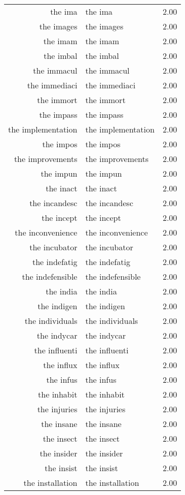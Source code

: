 \begin{table}[ht]
\begin{tabular}{rlr}
  the ima & the ima & 2.00 \\ 
  the images & the images & 2.00 \\ 
  the imam & the imam & 2.00 \\ 
  the imbal & the imbal & 2.00 \\ 
  the immacul & the immacul & 2.00 \\ 
  the immediaci & the immediaci & 2.00 \\ 
  the immort & the immort & 2.00 \\ 
  the impass & the impass & 2.00 \\ 
  the implementation & the implementation & 2.00 \\ 
  the impos & the impos & 2.00 \\ 
  the improvements & the improvements & 2.00 \\ 
  the impun & the impun & 2.00 \\ 
  the inact & the inact & 2.00 \\ 
  the incandesc & the incandesc & 2.00 \\ 
  the incept & the incept & 2.00 \\ 
  the inconvenience & the inconvenience & 2.00 \\ 
  the incubator & the incubator & 2.00 \\ 
  the indefatig & the indefatig & 2.00 \\ 
  the indefensible & the indefensible & 2.00 \\ 
  the india & the india & 2.00 \\ 
  the indigen & the indigen & 2.00 \\ 
  the individuals & the individuals & 2.00 \\ 
  the indycar & the indycar & 2.00 \\ 
  the influenti & the influenti & 2.00 \\ 
  the influx & the influx & 2.00 \\ 
  the infus & the infus & 2.00 \\ 
  the inhabit & the inhabit & 2.00 \\ 
  the injuries & the injuries & 2.00 \\ 
  the insane & the insane & 2.00 \\ 
  the insect & the insect & 2.00 \\ 
  the insider & the insider & 2.00 \\ 
  the insist & the insist & 2.00 \\ 
  the installation & the installation & 2.00 \\ 

\end{tabular}
\end{table}
